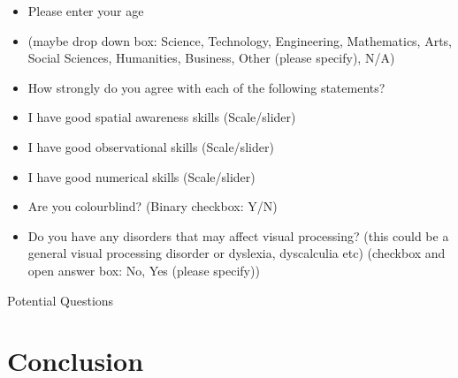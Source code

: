 \begin{itemize}
    \item Please enter your age
    
    \item (maybe drop down box: Science, Technology, Engineering, Mathematics, Arts, Social Sciences, Humanities, Business, Other (please specify), N/A)

    \item How strongly do you agree with each of the following statements?

    \item I have good spatial awareness skills (Scale/slider)
    
    \item I have good observational skills (Scale/slider)
    
    \item I have good numerical skills (Scale/slider)
    
    \item Are you colourblind? (Binary checkbox: Y/N)
    
    \item Do you have any disorders that may affect visual processing? (this could be a general visual processing disorder 
    or dyslexia, dyscalculia etc)
    (checkbox and open answer box: No, Yes (please specify))
\end{itemize}


Potential Questions






\section{Conclusion}
